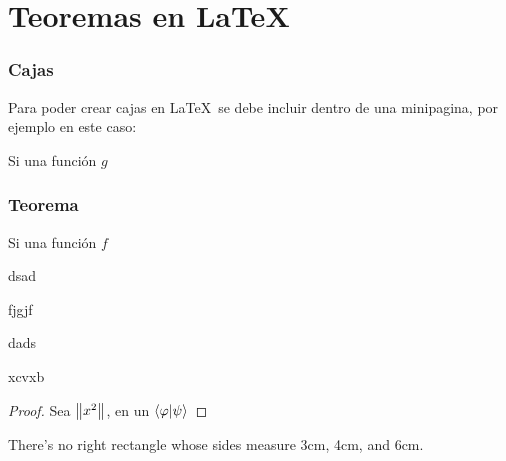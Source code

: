 \part{Teoremas en \LaTeX}
\section{Cajas}
Para poder crear cajas en \LaTeX~se debe incluir dentro de una minipagina, por ejemplo en este caso: 

\begin{theorem}
Si una función $g$
\end{theorem}

\section{Teorema}
\begin{theorem}
Si una función $f$
\end{theorem}

\begin{corollary}
dsad
\end{corollary}

\begin{lemma}
fjgjf
\end{lemma}

\begin{definition}
dads
\end{definition}

\begin{remark}
xcvxb
\end{remark}

\begin{proof}
Sea $\left\|x^{2}\right\|$, en un $\left<\varphi|\psi \right>$
\end{proof}


\begin{corollary}
There's no right rectangle whose sides measure 3cm, 4cm, and 6cm.
\end{corollary}
